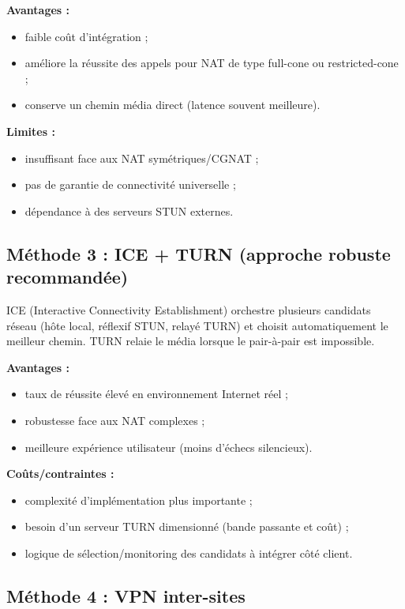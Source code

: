 \documentclass[12pt,a4paper]{article}
\begin{document}
	\textbf{Avantages :}
\begin{itemize}[leftmargin=1.2cm]
    \item faible coût d'intégration ;
    \item améliore la réussite des appels pour NAT de type full-cone ou restricted-cone ;
    \item conserve un chemin média direct (latence souvent meilleure).
\end{itemize}

	\textbf{Limites :}
\begin{itemize}[leftmargin=1.2cm]
    \item insuffisant face aux NAT symétriques/CGNAT ;
    \item pas de garantie de connectivité universelle ;
    \item dépendance à des serveurs STUN externes.
\end{itemize}

\subsection{Méthode 3 : ICE + TURN (approche robuste recommandée)}

ICE (Interactive Connectivity Establishment) orchestre plusieurs candidats réseau (hôte local, réflexif STUN, relayé TURN) et choisit automatiquement le meilleur chemin. TURN relaie le média lorsque le pair-à-pair est impossible.

	\textbf{Avantages :}
\begin{itemize}[leftmargin=1.2cm]
    \item taux de réussite élevé en environnement Internet réel ;
    \item robustesse face aux NAT complexes ;
    \item meilleure expérience utilisateur (moins d'échecs silencieux).
\end{itemize}

	\textbf{Coûts/contraintes :}
\begin{itemize}[leftmargin=1.2cm]
    \item complexité d'implémentation plus importante ;
    \item besoin d'un serveur TURN dimensionné (bande passante et coût) ;
    \item logique de sélection/monitoring des candidats à intégrer côté client.
\end{itemize}

\subsection{Méthode 4 : VPN inter-sites}
\end{document}
